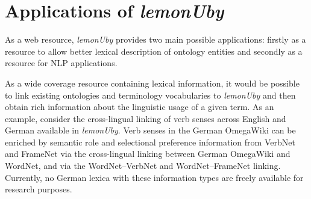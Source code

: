 \section{Applications of \emph{le\-mon\-U\-by}}
\noindent
As a web resource, \emph{le\-mon\-U\-by} provides two main possible applications: firstly as a resource
to allow better lexical description of ontology entities and secondly as a resource for NLP applications.

As a wide coverage resource containing lexical information, it would be possible to link existing ontologies
and terminology vocabularies to \emph{le\-mon\-U\-by} and then obtain rich information about the linguistic usage of a given term.
As an example, consider
the cross-lingual linking  of verb senses across English and German available in \emph{le\-mon\-U\-by}. 
Verb senses in the German OmegaWiki can be enriched by semantic role and selectional
preference information from VerbNet and FrameNet
via the cross-lingual linking between German OmegaWiki and WordNet, and via the WordNet--VerbNet and WordNet--FrameNet 
linking.
Currently, no German lexica with these information types are freely available for
research purposes.


